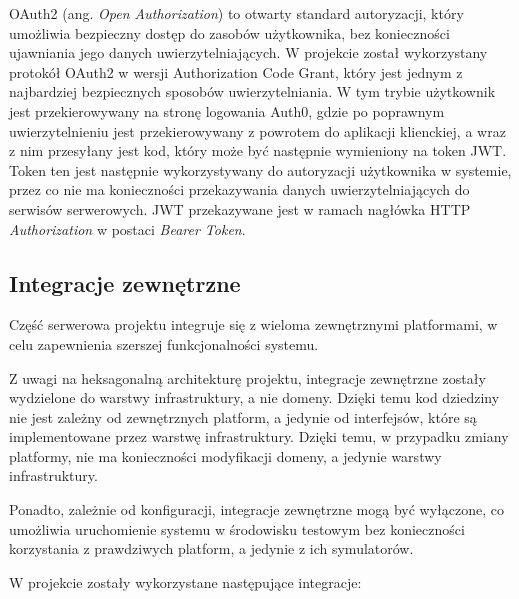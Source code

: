 OAuth2 (ang. \textit{Open Authorization}) to otwarty standard autoryzacji, który umożliwia bezpieczny dostęp do zasobów użytkownika, bez konieczności ujawniania jego danych uwierzytelniających. W projekcie został wykorzystany protokół OAuth2 w wersji Authorization Code Grant, który jest jednym z najbardziej bezpiecznych sposobów uwierzytelniania. W tym trybie użytkownik jest przekierowywany na stronę logowania Auth0, gdzie po poprawnym uwierzytelnieniu jest przekierowywany z powrotem do aplikacji klienckiej, a wraz z nim przesyłany jest kod, który może być następnie wymieniony na token JWT. Token ten jest następnie wykorzystywany do autoryzacji użytkownika w systemie, przez co nie ma konieczności przekazywania danych uwierzytelniających do serwisów serwerowych. JWT przekazywane jest w ramach nagłówka HTTP \textit{Authorization} w postaci \textit{Bearer Token}.

\subsection{Integracje zewnętrzne}

Część serwerowa projektu integruje się z wieloma zewnętrznymi platformami, w celu zapewnienia szerszej funkcjonalności systemu. 

Z uwagi na heksagonalną architekturę projektu, integracje zewnętrzne zostały wydzielone do warstwy infrastruktury, a nie domeny. Dzięki temu kod dziedziny nie jest zależny od zewnętrznych platform, a jedynie od interfejsów, które są implementowane przez warstwę infrastruktury. Dzięki temu, w przypadku zmiany platformy, nie ma konieczności modyfikacji domeny, a jedynie warstwy infrastruktury. 

Ponadto, zależnie od konfiguracji, integracje zewnętrzne mogą być wyłączone, co umożliwia uruchomienie systemu w środowisku testowym bez konieczności korzystania z prawdziwych platform, a jedynie z ich symulatorów.

W projekcie zostały wykorzystane następujące integracje:

